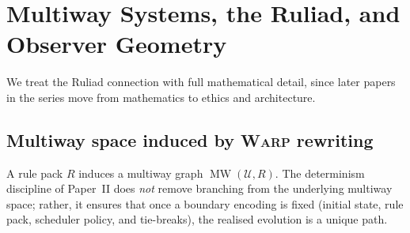 \documentclass{aion}
\DeclareMathOperator{\MW}{MW}
\providecommand{\sectionbreak}{\clearpage}
\begin{document}
\sectionbreak

\section{Multiway Systems, the Ruliad, and Observer Geometry}
\label{sec:multiway}

We treat the Ruliad connection with full mathematical detail, since later papers in the series
move from mathematics to ethics and architecture.

\subsection[Multiway space induced by warp rewriting]{Multiway space induced by \textnormal{\textsc{Warp}} rewriting}
\label{subsec:multiway-warps}

A rule pack $R$ induces a multiway graph $\MW(\mathcal{U},R)$.
The determinism discipline of Paper~II does \emph{not} remove branching from the underlying multiway space;
rather, it ensures that once a boundary encoding is fixed (initial state, rule pack, scheduler policy, and tie-breaks),
the realised evolution is a unique path.
\end{document}
